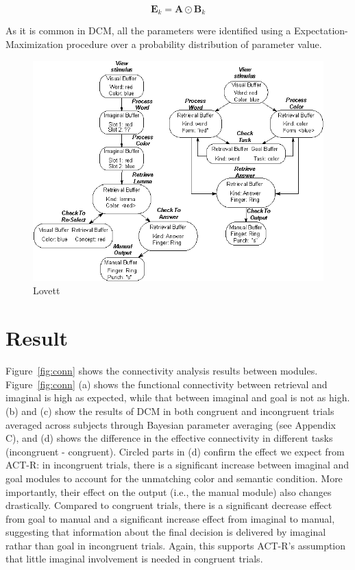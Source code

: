 \documentclass[10pt,letterpaper]{article}
\newcommand{\mat}[1]{\boldsymbol{#1}} %
\begin{document}
\begin{equation}
\mat{E}_k = \mat{A} \odot \mat{B}_k
\label{dcm:trick}
\end{equation}

As it is common in DCM, all the parameters were identified using a Expectation-Maximization procedure over a probability distribution of parameter value. 

\begin{figure}[ht]
\centering
  \includegraphics[width=\linewidth]{both_models.eps}
  \caption{Lovett}
\end{figure}%


 
\section{Result}

Figure~\ref{fig:conn} shows the connectivity analysis results between modules. Figure~\ref{fig:conn} (a) shows the functional connectivity between retrieval and imaginal is high as expected, while that between imaginal and goal is not as high. (b) and (c) show the results of DCM in both congruent and incongruent trials averaged across subjects through Bayesian parameter averaging \cite{Kasess2010} (see Appendix C), and (d) shows the difference in the effective connectivity in different tasks (incongruent - congruent). Circled parts in (d) confirm the effect we expect from ACT-R: in incongruent trials, there is a significant increase between imaginal and goal modules to account for the unmatching color and semantic condition. More importantly, their effect on the output (i.e., the manual module) also changes drastically. Compared to congruent trials, there is a significant decrease effect from goal to manual and a significant increase effect from imaginal to manual, suggesting that information about the final decision is delivered by imaginal rathar than goal in incongruent trials. Again, this supports ACT-R's assumption that little imaginal involvement is needed in congruent trials. 
\end{document}
